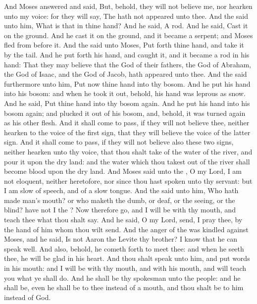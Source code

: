 \begin{biblechapter} %
 And Moses answered and said, But, behold, they will not believe me, nor hearken unto my voice: for they will say, The \LORD hath not appeared unto thee.
\verse And the \LORD said unto him, What is that in thine hand? And he said, A rod.
\verse And he said, Cast it on the ground. And he cast it on the ground, and it became a serpent; and Moses fled from before it.
\verse And the \LORD said unto Moses, Put forth thine hand, and take it by the tail. And he put forth his hand, and caught it, and it became a rod in his hand:
\verse That they may believe that the \LORD God of their fathers, the God of Abraham, the God of Isaac, and the God of Jacob, hath appeared unto thee.
\verse And the \LORD said furthermore unto him, Put now thine hand into thy bosom. And he put his hand into his bosom: and when he took it out, behold, his hand was leprous as snow.
\verse And he said, Put thine hand into thy bosom again. And he put his hand into his bosom again; and plucked it out of his bosom, and, behold, it was turned again as his other flesh.
\verse And it shall come to pass, if they will not believe thee, neither hearken to the voice of the first sign, that they will believe the voice of the latter sign.
\verse And it shall come to pass, if they will not believe also these two signs, neither hearken unto thy voice, that thou shalt take of the water of the river, and pour it upon the dry land: and the water which thou takest out of the river shall become blood upon the dry land.
\verse And Moses said unto the \LORD, O my Lord, I am not eloquent, neither heretofore, nor since thou hast spoken unto thy servant: but I am slow of speech, and of a slow tongue.
\verse And the \LORD said unto him, Who hath made man's mouth? or who maketh the dumb, or deaf, or the seeing, or the blind? have not I the \LORD?
\verse Now therefore go, and I will be with thy mouth, and teach thee what thou shalt say.
\verse And he said, O my Lord, send, I pray thee, by the hand of him whom thou wilt send.
\verse And the anger of the \LORD was kindled against Moses, and he said, Is not Aaron the Levite thy brother? I know that he can speak well. And also, behold, he cometh forth to meet thee: and when he seeth thee, he will be glad in his heart.
\verse And thou shalt speak unto him, and put words in his mouth: and I will be with thy mouth, and with his mouth, and will teach you what ye shall do.
\verse And he shall be thy spokesman unto the people: and he shall be, even he shall be to thee instead of a mouth, and thou shalt be to him instead of God.

\end{biblechapter}
